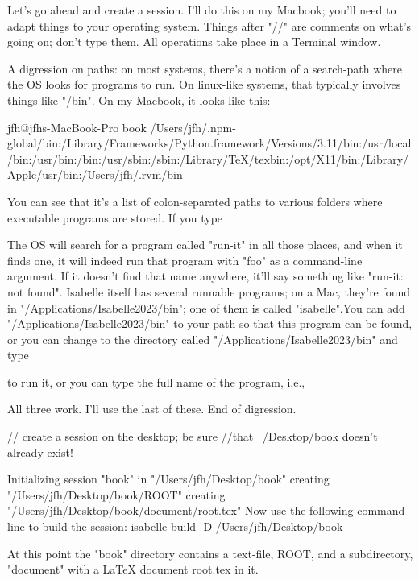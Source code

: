 Let's go ahead and create a session. I'll do this on my Macbook; you'll need to adapt things to your operating system. Things after "//" are comments on what's going on; don't type them. All operations take place in a Terminal window. 

A digression on paths: on most systems, there's a notion of a search-path where the OS looks for programs to run. On linux-like systems, that typically involves things like "/bin". On my Macbook, it looks like this:

jfh@jfhs-MacBook-Pro book %
/Users/jfh/.npm-global/bin:/Library/Frameworks/Python.framework/Versions/3.11/bin:/usr/local/bin:/usr/bin:/bin:/usr/sbin:/sbin:/Library/TeX/texbin:/opt/X11/bin:/Library/Apple/usr/bin:/Users/jfh/.rvm/bin

You can see that it's a list of colon-separated paths to various folders where executable programs are stored. If you type


The OS will search for a program called "run-it" in all those places, and when it finds one, it will indeed run that program with "foo" as a command-line argument. If it doesn't find that name anywhere, it'll say something like "run-it: not found". Isabelle itself has several runnable programs; on a Mac, they're found in "/Applications/Isabelle2023/bin"; one of them is called "isabelle".You can add "/Applications/Isabelle2023/bin" to your path so that this program can be found, or you can change to the directory called "/Applications/Isabelle2023/bin" and type 


to run it, or you can type the full name of the program, i.e., 


All three work. I'll use the last of these. End of digression.

              // create a session on the desktop; be sure 
        //that ~/Desktop/book doesn't already exist!

Initializing session "book" in "/Users/jfh/Desktop/book"
  creating "/Users/jfh/Desktop/book/ROOT"
  creating "/Users/jfh/Desktop/book/document/root.tex"
Now use the following command line to build the session:
  isabelle build -D /Users/jfh/Desktop/book

At this point the "book" directory contains a text-file, ROOT, and a subdirectory, "document" with a LaTeX document root.tex in it. 

